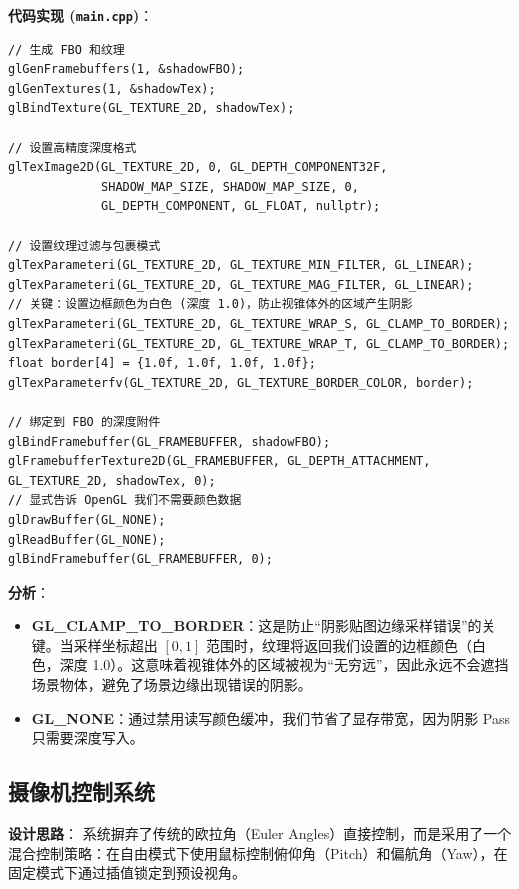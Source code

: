 \documentclass[a4paper]{article}
\begin{document}
\textbf{代码实现 (\texttt{main.cpp})}：
\begin{lstlisting}[caption={阴影帧缓冲初始化}]
// 生成 FBO 和纹理
glGenFramebuffers(1, &shadowFBO);
glGenTextures(1, &shadowTex);
glBindTexture(GL_TEXTURE_2D, shadowTex);

// 设置高精度深度格式
glTexImage2D(GL_TEXTURE_2D, 0, GL_DEPTH_COMPONENT32F, 
             SHADOW_MAP_SIZE, SHADOW_MAP_SIZE, 0, 
             GL_DEPTH_COMPONENT, GL_FLOAT, nullptr);

// 设置纹理过滤与包裹模式
glTexParameteri(GL_TEXTURE_2D, GL_TEXTURE_MIN_FILTER, GL_LINEAR);
glTexParameteri(GL_TEXTURE_2D, GL_TEXTURE_MAG_FILTER, GL_LINEAR);
// 关键：设置边框颜色为白色 (深度 1.0)，防止视锥体外的区域产生阴影
glTexParameteri(GL_TEXTURE_2D, GL_TEXTURE_WRAP_S, GL_CLAMP_TO_BORDER);
glTexParameteri(GL_TEXTURE_2D, GL_TEXTURE_WRAP_T, GL_CLAMP_TO_BORDER);
float border[4] = {1.0f, 1.0f, 1.0f, 1.0f};
glTexParameterfv(GL_TEXTURE_2D, GL_TEXTURE_BORDER_COLOR, border);

// 绑定到 FBO 的深度附件
glBindFramebuffer(GL_FRAMEBUFFER, shadowFBO);
glFramebufferTexture2D(GL_FRAMEBUFFER, GL_DEPTH_ATTACHMENT, GL_TEXTURE_2D, shadowTex, 0);
// 显式告诉 OpenGL 我们不需要颜色数据
glDrawBuffer(GL_NONE);
glReadBuffer(GL_NONE);
glBindFramebuffer(GL_FRAMEBUFFER, 0);
\end{lstlisting}

\textbf{分析}：
\begin{itemize}
    \item \textbf{GL\_CLAMP\_TO\_BORDER}：这是防止“阴影贴图边缘采样错误”的关键。当采样坐标超出 $[0, 1]$ 范围时，纹理将返回我们设置的边框颜色（白色，深度 1.0）。这意味着视锥体外的区域被视为“无穷远”，因此永远不会遮挡场景物体，避免了场景边缘出现错误的阴影。
    \item \textbf{GL\_NONE}：通过禁用读写颜色缓冲，我们节省了显存带宽，因为阴影 Pass 只需要深度写入。
\end{itemize}

\subsection{摄像机控制系统}

\textbf{设计思路}：
系统摒弃了传统的欧拉角（Euler Angles）直接控制，而是采用了一个混合控制策略：在自由模式下使用鼠标控制俯仰角（Pitch）和偏航角（Yaw），在固定模式下通过插值锁定到预设视角。
\end{document}
